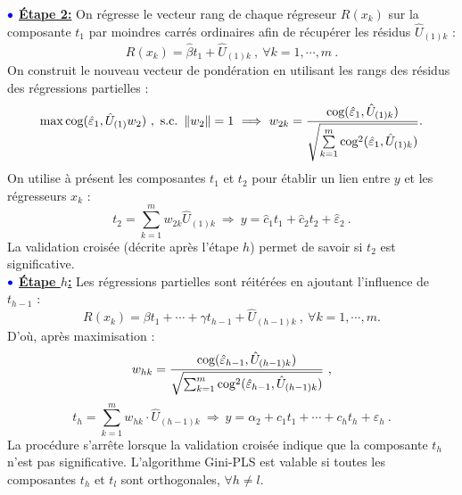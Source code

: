 $\bulle$ \underline{\textbf{Étape 2:}} On régresse le vecteur rang de chaque régreseur $R(x_k)$ sur la composante $t_1$ par moindres carrés ordinaires afin de récupérer les résidus $\hat{U}_{(1)k}$ : 
\[
R(x_k) = \hat{\beta}t_1 + \hat{U}_{(1)k} \ , \ \forall k = 1,\cdots, m \ .
\]
On construit le nouveau vecteur de pondération en utilisant les rangs des résidus des régressions partielles :
\[
\mathop{\mathrm{max}}\limits \text{cog}(\hat{\varepsilon}_1,\hat{U}_{(1)} w_2) \ , \ \text{s.c.} \ \left\|w_2\right\|=1 \ \Longrightarrow \ w_{2k} = \frac{\text{cog}(\hat{\varepsilon}_1,\hat{U}_{(1)k})}{\sqrt{\sum\limits_{k=1}^m \text{cog}^2(\hat{\varepsilon}_1,\hat{U}_{(1)k})}} .
\]
On utilise à présent les composantes $t_1$ et $t_2$ pour établir un lien entre $y$ et les régresseurs $x_k$ :
\[
t_2 = \sum\limits^m_{k=1} w_{2k} \hat{U}_{(1)k} \ \Longrightarrow \ y = \hat{c}_1 t_1 + \hat{c}_2 t_2 + \hat{\varepsilon}_2 \ .
\]
La validation croisée (décrite après l'étape $h$) permet de savoir si $t_2$ est significative.\\

$\bulle$ \underline{\textbf{Étape $h$:}} Les régressions partielles sont réitérées en ajoutant l'influence de $t_{h-1}$ :
\[
R(x_k) = \beta t_1 + \cdots + \gamma t_{h-1} + \hat{U}_{(h-1)k} \ , \ \forall k = 1,\cdots, m.
\]
D'où, après maximisation :
\[
w_{hk} = \frac{\text{cog}(\hat{\varepsilon}_{h-1},\hat{U}_{(h-1)k})}{\sqrt{\sum_{k=1}^m \text{cog}^2(\hat{\varepsilon}_{h-1},\hat{U}_{(h-1)k})}} \ ,
\]
\[
t_h = \sum_{k=1}^m w_{hk}\cdot \hat{U}_{(h-1)k} \ \Longrightarrow \ y = \alpha_2 + c_1 t_1 + \cdots + c_h t_h + \varepsilon_h \ .
\]
La procédure s'arrête lorsque la validation croisée indique que la composante $t_h$ n'est pas significative. L'algorithme Gini-PLS est valable si toutes les composantes $t_h$ et $t_l$ sont orthogonales, $\forall h\neq l$. 

\medskip

